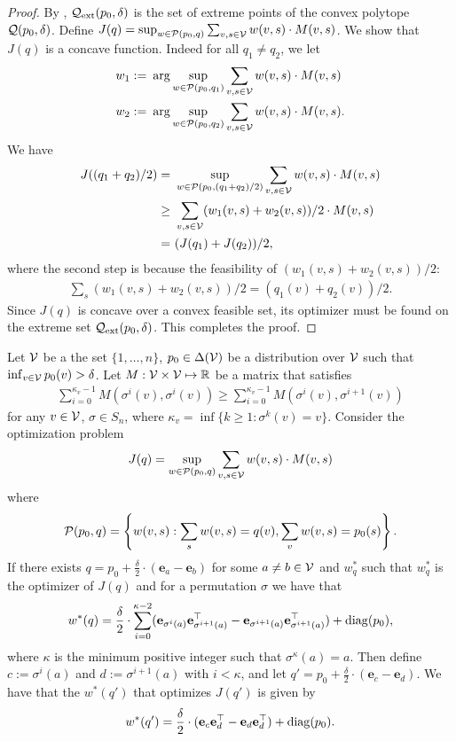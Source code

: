 \begin{proof}
By , $\mathcal{Q}_{\mathrm{ext}}(p_0,\delta)$ is the set of extreme points of the convex polytope $\mathcal{Q}(p_0,\delta)$. 
Define $J(q) = \sup_{w \in \mathcal{P}(p_0,q)} \sum_{v,s \in \mathcal{V}} w(v,s) \cdot M(v,s)$. We show that $J(q)$ is a concave function. Indeed for all $q_1 \neq q_2$, we let 
\begin{align*}
    w_1 := &~ \arg \sup_{w \in \mathcal{P}(p_0,q_1)} \sum_{v,s \in \mathcal{V}} w(v,s) \cdot M(v,s)\\
    w_2 := &~ \arg \sup_{w \in \mathcal{P}(p_0,q_2)} \sum_{v,s \in \mathcal{V}} w(v,s) \cdot M(v,s).
\end{align*}
We have
\begin{align*}
    J((q_1+q_2)/2) = &~ \sup_{w \in \mathcal{P}(p_0,(q_1+q_2)/2)} \sum_{v,s \in \mathcal{V}} w(v,s) \cdot M(v,s) \\
    \geq &~ \sum_{v,s \in \mathcal{V}} (w_1(v,s) + w_2(v,s)) /2 \cdot M(v,s)\\
    = &~ (J(q_1)+J(q_2))/2,
\end{align*}
where the second step is because the feasibility of $(w_1(v,s) + w_2(v,s))/2$:
\begin{align*}
    \sum_{s}(w_1(v,s) + w_2(v,s))/2 = (q_1(v)+q_2(v))/2.
\end{align*}
Since $J(q)$ is concave over a convex feasible set, its optimizer must be found on the extreme set $\mathcal{Q}_{\mathrm{ext}}(p_0,\delta)$. This completes the proof.
\end{proof}


\begin{lemma}\label{lem:optimalpaths}
Let $\mathcal{V}$ be a the set $\{1,\dots,n\}$, $p_0 \in \Delta(\mathcal{V})$ be a distribution over $\mathcal{V}$ such that $\inf_{v \in \mathcal{V}}p_0(v) > \delta$.
Let $M: \mathcal{V} \times \mathcal{V} \mapsto \mathbb{R}$ be a matrix that satisfies
\begin{align*}
    \sum_{i=0}^{\kappa_v-1} M(\sigma^i(v),\sigma^i(v)) 
     \geq  \sum_{i=0}^{\kappa_v-1} M(\sigma^i(v),\sigma^{i+1}(v))
\end{align*}
for any $v \in \mathcal{V}$, $\sigma \in S_n$, where $\kappa_v = \inf\{k\ge1:\sigma^{k}(v) = v\}$. 
Consider the optimization problem
$$J(q) = \sup_{w \in \mathcal{P}(p_0,q)}\sum_{v,s \in \mathcal{V}}w(v,s)\cdot M(v,s)$$
where 
$$\mathcal{P}(p_0,q) = \left\{w(v,s): \sum_{s}w(v,s) = q(v), \sum_vw(v,s) =  p_0(s)\right\}.$$
If there exists $q = p_0 + \frac{\delta}{2}\cdot(\mathbf{e}_a-\mathbf{e}_b)$ for some $a \neq b \in \mathcal{V}$ and $w^*_q$ such that $w^*_q$ is the optimizer of $J(q)$ and for a permutation $\sigma$ we have that
$$w^*(q) = \frac{\delta}{2} \cdot \sum_{i=0}^{\kappa-2} (\mathbf{e}_{\sigma^{i}(a)}\mathbf{e}_{\sigma^{i+1}(a)}^\top - \mathbf{e}_{\sigma^{i+1}(a)}\mathbf{e}_{\sigma^{i+1}(a)}^\top) + \mathrm{diag}(p_0),$$
where $\kappa$ is the minimum positive integer such that $\sigma^{\kappa}(a) = a$. Then define $c := \sigma^{i}(a)$ and $d := \sigma^{i+1}(a)$ with $i < \kappa$, and let $q' = p_0 + \frac{\delta}{2}\cdot (\mathbf{e}_c - \mathbf{e}_d)$. We have that the $w^*(q')$ that optimizes $J(q')$ is given by
$$w^*(q') = \frac{\delta}{2}\cdot(\mathbf{e}_{c}\mathbf{e}_d^\top - \mathbf{e}_d \mathbf{e}_d^\top) + \mathrm{diag}(p_0).$$
\end{lemma}

